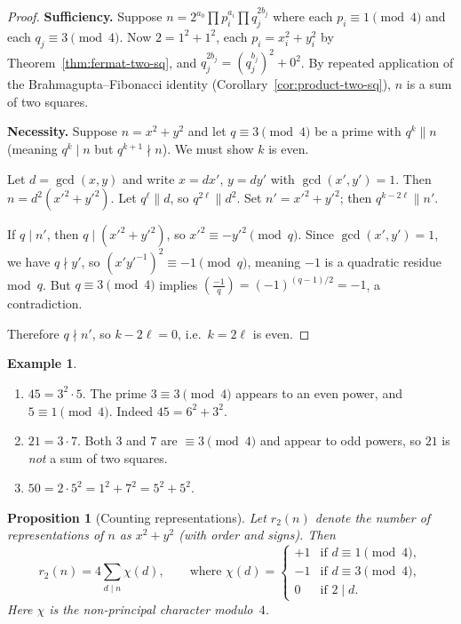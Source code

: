 \documentclass[12pt,a4paper,openany]{book}
\theoremstyle{definition}
\newtheorem{example}[definition]{Example}
\theoremstyle{plain}
\newtheorem{proposition}[definition]{Proposition}
\theoremstyle{remark}
\newcommand{\legendre}[2]{\left(\frac{#1}{#2}\right)}
\begin{document}
\begin{proof}
\textbf{Sufficiency.}
Suppose $n = 2^{a_0} \prod p_i^{a_i} \prod q_j^{2b_j}$ where each $p_i \equiv 1 \pmod 4$
and each $q_j \equiv 3 \pmod 4$.  Now $2 = 1^2 + 1^2$, each $p_i = x_i^2 + y_i^2$
by Theorem~\ref{thm:fermat-two-sq}, and $q_j^{2b_j} = (q_j^{b_j})^2 + 0^2$.
By repeated application of the Brahmagupta--Fibonacci identity
(Corollary~\ref{cor:product-two-sq}), $n$ is a sum of two squares.

\smallskip
\textbf{Necessity.}
Suppose $n = x^2 + y^2$ and let $q \equiv 3 \pmod{4}$ be a prime with
$q^k \| n$ (meaning $q^k \mid n$ but $q^{k+1} \nmid n$).  We must show
$k$ is even.

Let $d = \gcd(x,y)$ and write $x = dx'$, $y = dy'$ with $\gcd(x',y')=1$.
Then $n = d^2(x'^2 + y'^2)$.  Let $q^\ell \| d$, so $q^{2\ell} \| d^2$.
Set $n' = x'^2 + y'^2$; then $q^{k - 2\ell} \| n'$.

If $q \mid n'$, then $q \mid (x'^2 + y'^2)$, so $x'^2 \equiv -y'^2 \pmod{q}$.
Since $\gcd(x',y')=1$, we have $q \nmid y'$, so $(x' y'^{-1})^2 \equiv -1 \pmod{q}$,
meaning $-1$ is a quadratic residue mod~$q$.  But $q \equiv 3 \pmod{4}$ implies
$\legendre{-1}{q} = (-1)^{(q-1)/2} = -1$, a contradiction.

Therefore $q \nmid n'$, so $k - 2\ell = 0$, i.e.\ $k = 2\ell$ is even.
\end{proof}

\begin{example}\label{ex:two-sq-examples}
\leavevmode
\begin{enumerate}[label=(\alph*)]
  \item $45 = 3^2 \cdot 5$.  The prime $3 \equiv 3 \pmod{4}$ appears to an
        even power, and $5 \equiv 1 \pmod{4}$.  Indeed $45 = 6^2 + 3^2$.
  \item $21 = 3 \cdot 7$.  Both $3$ and $7$ are $\equiv 3 \pmod{4}$ and
        appear to odd powers, so $21$ is \emph{not} a sum of two squares.
  \item $50 = 2 \cdot 5^2 = 1^2 + 7^2 = 5^2 + 5^2$.
\end{enumerate}
\end{example}

\begin{proposition}[Counting representations]\label{prop:r2-count}
Let $r_2(n)$ denote the number of representations of $n$ as $x^2 + y^2$
(with order and signs).  Then
\[
  r_2(n) = 4\!\sum_{d \mid n} \chi(d),
  \qquad \text{where } \chi(d) = \begin{cases}
    +1 & \text{if } d \equiv 1 \pmod{4},\\
    -1 & \text{if } d \equiv 3 \pmod{4},\\
     0  & \text{if } 2 \mid d.
  \end{cases}
\]
Here $\chi$ is the non-principal character modulo~$4$.
\end{proposition}
\end{document}
